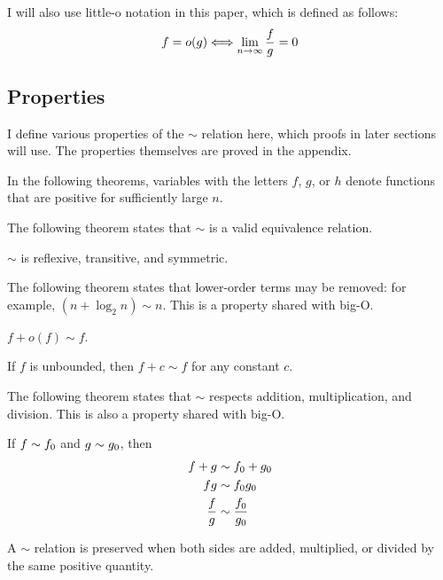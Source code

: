 I will also use little-o notation in this paper, which is defined as follows:
\begin{align*}
f = o(g) \Longleftrightarrow \lim_{n \to \infty} \frac{f}{g} = 0
\end{align*}
\subsection{Properties}
\label{subsec:AsymptoticProperties}

I define various properties of the $\sim$ relation here, which proofs in later sections will use. The properties themselves are proved in the appendix.

{\HdrNote} In the following theorems, variables with the letters $f$, $g$, or $h$ denote functions that are positive for sufficiently large $n$.

The following theorem states that $\sim$ is a valid equivalence relation.

\begin{theorem}
\label{thm:EquivalenceRelation}
	$\sim$ is reflexive, transitive, and symmetric.
\end{theorem}

The following theorem states that lower-order terms may be removed: for example, $(n + \log_2 n) \sim n$. This is a property shared with big-O.

\begin{theorem}
\label{thm:RemovesLowerOrderTerms}
	$f + o(f) \sim f$.
\end{theorem}

\begin{corollary}
\label{coro:PlusConstant}
	If $f$ is unbounded, then $f + c \sim f$ for any constant $c$.
\end{corollary}

The following theorem states that $\sim$ respects addition, multiplication, and division. This is also a property shared with big-O.

\begin{theorem}
\label{thm:MergesOverOps}
	If $f \sim f_0$ and $g \sim g_0$, then
	\begin{align*}
	f + g &\sim f_0 + g_0\\
	fg &\sim f_0g_0\\
	\frac{f}{g} &\sim \frac {f_0} {g_0}
	\end{align*}
\end{theorem}

\begin{corollary}
\label{coro:BothSides}
	A $\sim$ relation is preserved when both sides are added, multiplied, or divided by the same positive quantity.
\end{corollary}

